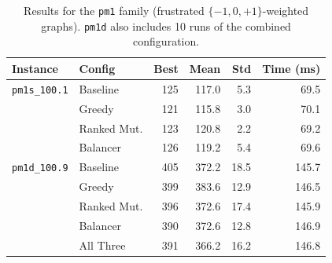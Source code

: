\documentclass[12pt]{article}
\begin{document}
\begin{table}[H]
\centering
\begin{tabular}{|l|l|r|r|r|r|}
\toprule
\textbf{Instance} & \textbf{Config} & \textbf{Best} & \textbf{Mean} & \textbf{Std} & \textbf{Time (ms)} \\
\midrule
\texttt{pm1s\_100.1} & \cellcolor{clrBaseline!25}Baseline  & \cellcolor{clrBaseline!25}125 & \cellcolor{clrBaseline!25}117.0 & \cellcolor{clrBaseline!25}5.3  & \cellcolor{clrBaseline!25}69.5  \\
                     & \cellcolor{clrGreedy!25}Greedy      & \cellcolor{clrGreedy!25}121   & \cellcolor{clrGreedy!25}115.8  & \cellcolor{clrGreedy!25}3.0   & \cellcolor{clrGreedy!25}70.1   \\
                     & \cellcolor{clrRanked!25}Ranked Mut. & \cellcolor{clrRanked!25}123   & \cellcolor{clrRanked!25}120.8  & \cellcolor{clrRanked!25}2.2   & \cellcolor{clrRanked!25}69.2   \\
                     & \cellcolor{clrBalancer!25}Balancer  & \cellcolor{clrBalancer!25}126 & \cellcolor{clrBalancer!25}119.2 & \cellcolor{clrBalancer!25}5.4 & \cellcolor{clrBalancer!25}69.6  \\
\midrule
\texttt{pm1d\_100.9} & \cellcolor{clrBaseline!25}Baseline  & \cellcolor{clrBaseline!25}405 & \cellcolor{clrBaseline!25}372.2 & \cellcolor{clrBaseline!25}18.5 & \cellcolor{clrBaseline!25}145.7 \\
                     & \cellcolor{clrGreedy!25}Greedy      & \cellcolor{clrGreedy!25}399   & \cellcolor{clrGreedy!25}383.6  & \cellcolor{clrGreedy!25}12.9  & \cellcolor{clrGreedy!25}146.5  \\
                     & \cellcolor{clrRanked!25}Ranked Mut. & \cellcolor{clrRanked!25}396   & \cellcolor{clrRanked!25}372.6  & \cellcolor{clrRanked!25}17.4  & \cellcolor{clrRanked!25}145.9  \\
                     & \cellcolor{clrBalancer!25}Balancer  & \cellcolor{clrBalancer!25}390 & \cellcolor{clrBalancer!25}372.6 & \cellcolor{clrBalancer!25}12.8 & \cellcolor{clrBalancer!25}146.9 \\
                     & \cellcolor{clrAll!25}All Three      & \cellcolor{clrAll!25}391      & \cellcolor{clrAll!25}366.2     & \cellcolor{clrAll!25}16.2     & \cellcolor{clrAll!25}146.8     \\
\bottomrule
\end{tabular}
\caption{Results for the \texttt{pm1} family (frustrated $\{-1,0,+1\}$-weighted graphs).
         \texttt{pm1d} also includes 10 runs of the combined configuration.}
\label{tab:results-pm1}
\end{table}
\end{document}
